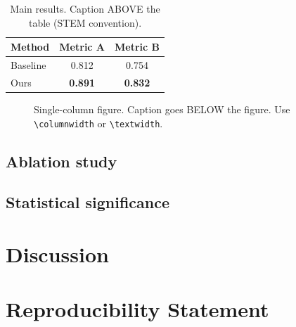 \documentclass[11pt,a4paper]{article}
\begin{document}
\begin{table}[t]
\caption{Main results. Caption ABOVE the table (STEM convention).}
\label{tab:results}
\centering
\begin{tabular}{lcc}
\toprule
Method   & Metric A       & Metric B       \\
\midrule
Baseline & 0.812          & 0.754          \\
Ours     & \textbf{0.891} & \textbf{0.832} \\
\bottomrule
\end{tabular}
\end{table}

\begin{figure}[t]
\centering
\fbox{\rule{0pt}{4cm}\rule{0.9\columnwidth}{0pt}}
\caption{Single-column figure. Caption goes BELOW the figure. Use
\texttt{\textbackslash columnwidth} or \texttt{\textbackslash textwidth}.}
\label{fig:result}
\end{figure}

\subsection{Ablation study}

\subsection{Statistical significance}

\section{Discussion}
\label{sec:discussion}

\section*{Reproducibility Statement}
\end{document}
